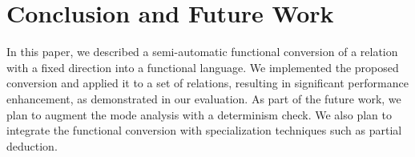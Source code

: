 \section{Conclusion and Future Work}
\label{sec:conclusion}

In this paper, we described a semi-automatic functional conversion of a \micro relation with a fixed direction into a functional language.
We implemented the proposed conversion and applied it to a set of relations, resulting in significant performance enhancement, as demonstrated in our evaluation.
As part of the future work, we plan to augment the mode analysis with a determinism check.
We also plan to integrate the functional conversion with specialization techniques such as partial deduction.